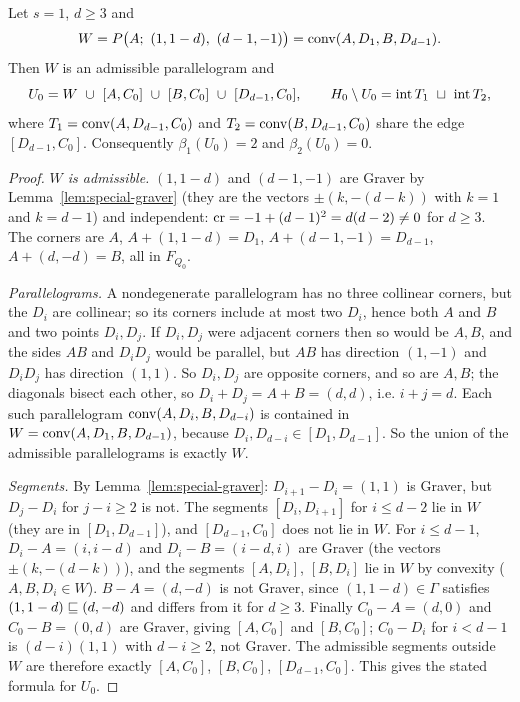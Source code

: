 \begin{proposition}[The class $s=1$]\label{prop:special-plus}
Let $s=1$, $d\ge3$ and
\[
  W=P\bigl(A;\ (1,1-d),\ (d-1,-1)\bigr)=\conv(A,D_1,B,D_{d-1}).
\]
Then $W$ is an admissible parallelogram and
\[
  U_0=W\ \cup\ [A,C_0]\ \cup\ [B,C_0]\ \cup\ [D_{d-1},C_0],\qquad
  H_0\setminus U_0=\interior T_1\ \sqcup\ \interior T_2,
\]
where $T_1=\operatorname{conv}(A,D_{d-1},C_0)$ and $T_2=\operatorname{conv}(B,D_{d-1},C_0)$ share the edge $[D_{d-1},C_0]$. Consequently $\beta_1(U_0)=2$ and $\beta_2(U_0)=0$.
\end{proposition}
\begin{proof}
\emph{$W$ is admissible.} $(1,1-d)$ and $(d-1,-1)$ are Graver by Lemma~\ref{lem:special-graver} (they are the vectors $\pm(k,-(d-k))$ with $k=1$ and $k=d-1$) and independent: $\operatorname{cr}=-1+(d-1)^2=d(d-2)\ne0$ for $d\ge3$. The corners are $A$, $A+(1,1-d)=D_1$, $A+(d-1,-1)=D_{d-1}$, $A+(d,-d)=B$, all in $F_{Q_0}$.

\emph{Parallelograms.} A nondegenerate parallelogram has no three collinear corners, but the $D_i$ are collinear; so its corners include at most two $D_i$, hence both $A$ and $B$ and two points $D_i,D_j$. If $D_i,D_j$ were adjacent corners then so would be $A,B$, and the sides $AB$ and $D_iD_j$ would be parallel, but $AB$ has direction $(1,-1)$ and $D_iD_j$ has direction $(1,1)$. So $D_i,D_j$ are opposite corners, and so are $A,B$; the diagonals bisect each other, so $D_i+D_j=A+B=(d,d)$, i.e. $i+j=d$. Each such parallelogram $\operatorname{conv}(A,D_i,B,D_{d-i})$ is contained in $W=\operatorname{conv}(A,D_1,B,D_{d-1})$, because $D_i,D_{d-i}\in[D_1,D_{d-1}]$. So the union of the admissible parallelograms is exactly $W$.

\emph{Segments.} By Lemma~\ref{lem:special-graver}: $D_{i+1}-D_i=(1,1)$ is Graver, but $D_j-D_i$ for $j-i\ge2$ is not. The segments $[D_i,D_{i+1}]$ for $i\le d-2$ lie in $W$ (they are in $[D_1,D_{d-1}]$), and $[D_{d-1},C_0]$ does not lie in $W$. For $i\le d-1$, $D_i-A=(i,i-d)$ and $D_i-B=(i-d,i)$ are Graver (the vectors $\pm(k,-(d-k))$), and the segments $[A,D_i]$, $[B,D_i]$ lie in $W$ by convexity ($A,B,D_i\in W$). $B-A=(d,-d)$ is not Graver, since $(1,1-d)\in\Gamma$ satisfies $(1,1-d)\sqsubseteq(d,-d)$ and differs from it for $d\ge3$. Finally $C_0-A=(d,0)$ and $C_0-B=(0,d)$ are Graver, giving $[A,C_0]$ and $[B,C_0]$; $C_0-D_i$ for $i<d-1$ is $(d-i)(1,1)$ with $d-i\ge2$, not Graver. The admissible segments outside $W$ are therefore exactly $[A,C_0]$, $[B,C_0]$, $[D_{d-1},C_0]$. This gives the stated formula for $U_0$.


\end{proof}
